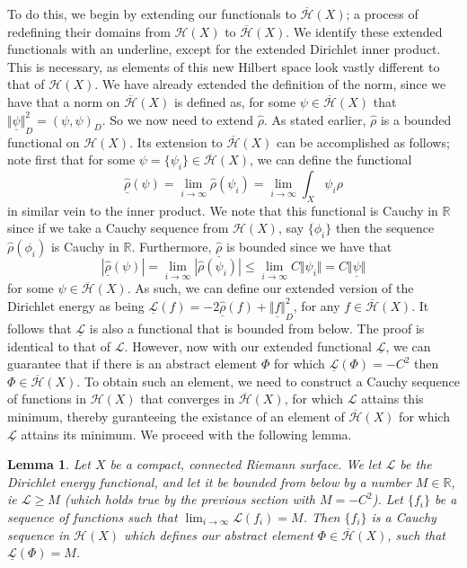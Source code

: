 \documentclass[11pt]{report}
\newtheorem{lemma}[thm]{Lemma}
\theoremstyle{definition}
\begin{document}
To do this, we begin by extending our functionals to $\overline{\mathcal{H}}(X)$; a process of redefining their domains from $\mathcal{H}(X)$ to $\overline{\mathcal{H}}(X)$. We identify these extended functionals with an underline, except for the extended Dirichlet inner product. This is necessary, as elements of this new Hilbert space look vastly different to that of $\mathcal{H}(X)$. We have already extended the definition of the norm, since we have that a norm on $\overline{\mathcal{H}}(X)$ is defined as, for some $\psi \in \overline{\mathcal{H}}(X)$ that $\underline{\Vert\psi\Vert}_D^2 = (\psi, \psi)_D$.
So we now need to extend $\hat{\rho}$. As stated earlier, $\hat{\rho}$ is a bounded functional on $\mathcal{H}(X)$. Its extension to $\overline{\mathcal{H}}(X)$ can be accomplished as follows; note first that for some $\psi = \{\psi_i\} \in \overline{\mathcal{H}}(X)$, we can define the functional 
\[\underline{\hat{\rho}}(\psi) = \lim_{i \rightarrow \infty} \hat{\rho}(\psi_i) = \lim_{i \rightarrow \infty} \int_X \psi_i\rho\]
in similar vein to the inner product. We note that this functional is Cauchy in $\mathbb{R}$ since if we take a Cauchy sequence from $\mathcal{H}(X)$, say $\{\phi_i\}$ then the sequence $\hat{\rho}(\phi_i)$ is Cauchy in $\mathbb{R}$.
Furthermore, $\underline{\hat{\rho}}$ is bounded since we have that 
\[ |\underline{\hat{\rho}}(\psi)| = \lim_{i \rightarrow \infty}|\hat{\rho}(\psi_i)| \leq \lim_{i \rightarrow \infty}C\Vert \psi_i \Vert = C\underline{\Vert \psi\Vert} \] for some $\psi \in \overline{\mathcal{H}}(X)$.
As such, we can define our extended version of the Dirichlet energy as being
$\underline{\mathcal{L}}(f) =  -2\underline{\hat{\rho}}(f) + \underline{\Vert f \Vert}_D^2$, for any $f \in \overline{\mathcal{H}}(X)$. It follows that $\underline{\mathcal{L}}$ is also a functional that is bounded from below. The proof is identical to that of $\mathcal{L}$. However, now with our extended functional $\underline{\mathcal{L}}$, we can guarantee that if there is an abstract element $\Phi$ for which $\underline{\mathcal{L}}(\Phi) = -C^2$ then $\Phi \in \overline{\mathcal{H}}(X)$. To obtain such an element, we need to construct a Cauchy sequence of functions in $\mathcal{H}(X)$ that converges in $\overline{\mathcal{H}}(X)$, for which $\mathcal{L}$ attains this minimum, thereby guranteeing the existance of an element of $\overline{\mathcal{H}}(X)$ for which $\underline{\mathcal{L}}$ attains its minimum. We proceed with the following lemma.
\begin{lemma}
  Let $X$ be a compact, connected Riemann surface. We let $\mathcal{L}$ be the Dirichlet energy functional, and let it be bounded from below by a number $M \in \mathbb{R}$, ie $\mathcal{L} \geq M$ (which holds true by the previous section with $M=-C^2$).
  Let $\{f_i\}$ be a sequence of functions such that $\lim_{i \rightarrow \infty}\mathcal{L}(f_i) = M$. Then $\{f_i\}$ is a Cauchy sequence in $\mathcal{H}(X)$ which defines our abstract element $\Phi \in \overline{\mathcal{H}}(X)$, such that $\underline{\mathcal{L}}(\Phi) = M$.
\end{lemma}
\end{document}
